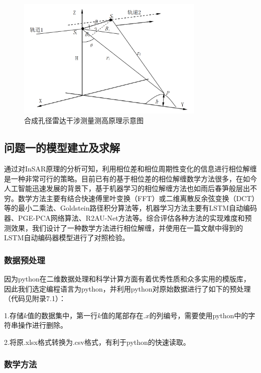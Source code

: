 \documentclass[a4paper]{article}
\begin{document}
	\begin{figure}[H] %
		\centering %
		\includegraphics[width=0.8\textwidth]{insar_priciple.png} %
		\caption{合成孔径雷达干涉测量测高原理示意图}
		\label{fig:insar_principle} %
	\end{figure}
	
	\subsection{问题一的模型建立及求解}

	通过对InSAR原理的分析可知，利用相位差和相位周期性变化的信息进行相位解缠是一种非常可行的策略。目前已有的基于相位差的相位解缠数学方法很多，在如今人工智能迅速发展的背景下，基于机器学习的相位解缠方法也如雨后春笋般层出不穷。数学方法主要有结合快速傅里叶变换（FFT）或二维离散反余弦变换（DCT）等的最小二乘法、Goldstein路径积分算法等，机器学习方法主要有LSTM自动编码器、PGE-PCA网络算法、R2AU-Net方法等。综合评估各种方法的实现难度和预测效果，我们设计了一种数学方法进行相位解缠，并使用在一篇文献中得到的LSTM自动编码器模型进行了对照检验。

	\subsubsection{数据预处理}

	因为python在二维数据处理和科学计算方面有着优秀性质和众多实用的模版库，因此我们选定编程语言为python，并利用python对原始数据进行了如下的预处理（代码见附录7.1）：\par
	1.存储$ k $值的数据集中，第一行$ k $值的尾部存在$ .x $的列编号，需要使用python中的字符串操作进行删除。\par
	2.将原.xlsx格式转换为.csv格式，有利于python的快速读取。

	\subsubsection{数学方法}
\end{document}
